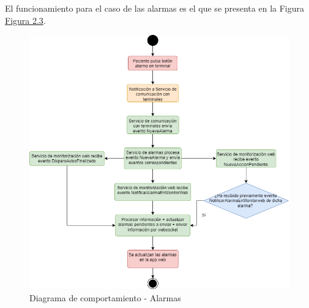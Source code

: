 El funcionamiento para el caso de las alarmas es el que se presenta en la Figura \hyperref[fig:flujograma-alarmas]{Figura 2.3}.

\begin{figure}[H]
    \centering
    \includegraphics[width=15cm]{Imagenes/Flujograma-alarmas.png}
    \caption{Diagrama de comportamiento - Alarmas}
    \label{fig:flujograma-alarmas}
\end{figure}

